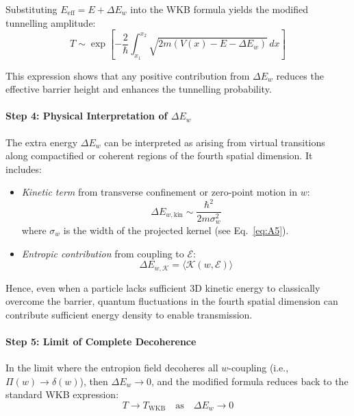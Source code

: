 \documentclass[12pt]{article}
\begin{document}
Substituting \(E_{\text{eff}} = E + \Delta E_w\) into the WKB formula yields the modified tunnelling amplitude:
\begin{equation}
T \sim \exp\left[ -\frac{2}{\hbar} \int_{x_1}^{x_2} \sqrt{2m \left( V(x) - E - \Delta E_w \right)}\, dx \right]
\label{eq:A10_ModifiedWKB}
\end{equation}

This expression shows that any positive contribution from \(\Delta E_w\) reduces the effective barrier height and enhances the tunnelling probability.

\paragraph{Step 4: Physical Interpretation of \(\Delta E_w\)}

The extra energy \(\Delta E_w\) can be interpreted as arising from virtual transitions along compactified or coherent regions of the fourth spatial dimension. It includes:

\begin{itemize}
  \item \emph{Kinetic term} from transverse confinement or zero-point motion in \(w\):  
  \begin{equation}
  \Delta E_{w,\text{kin}} \sim \frac{\hbar^2}{2m\sigma_w^2}
  \end{equation}
  where \(\sigma_w\) is the width of the projected kernel (see Eq.~\eqref{eq:A5}).
  
  \item \emph{Entropic contribution} from coupling to \(\mathcal{E}\):  
  \begin{equation}
  \Delta E_{w,\mathcal{K}} = \langle \mathcal{K}(w, \mathcal{E}) \rangle
  \end{equation}
\end{itemize}

Hence, even when a particle lacks sufficient 3D kinetic energy to classically overcome the barrier, quantum fluctuations in the fourth spatial dimension can contribute sufficient energy density to enable transmission.

\paragraph{Step 5: Limit of Complete Decoherence}

In the limit where the entropion field decoheres all \(w\)-coupling (i.e., \(\Pi(w) \to \delta(w)\)), then \(\Delta E_w \to 0\), and the modified formula reduces back to the standard WKB expression:
\begin{equation}
T \to T_{\text{WKB}} \quad \text{as} \quad \Delta E_w \to 0
\end{equation}
\end{document}
